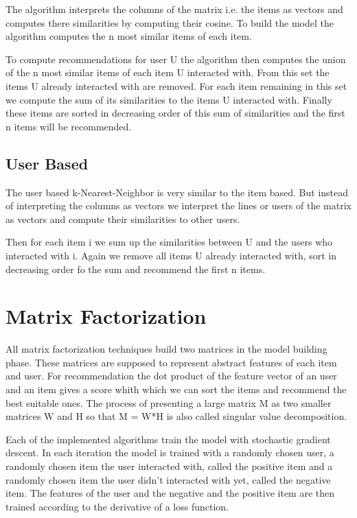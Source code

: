 The algorithm interprets the columns of the matrix i.e. the items
as vectors and computes there similarities by computing their cosine.
To build the model the algorithm computes the n most similar items
of each item. 

To compute recommendations for user U the algorithm then computes
the union of the n most similar items of each item U interacted with.
From this set the items U already interacted with are removed. For
each item remaining in this set we compute the sum of its similarities
to the items U interacted with. Finally these items are sorted in
decreasing order of this sum of similarities and the first n items
will be recommended\cite{Karypis:2001:EIT:502585.502627}.


\subsection{User Based}

The user based k-Nearest-Neighbor is very similar to the item based.
But instead of interpreting the columns as vectors we interpret the
lines or users of the matrix as vectors and compute their similarities
to other users.

Then for each item i we sum up the similarities between U and the
users who interacted with i. Again we remove all items U already interacted
with, sort in decreasing order fo the sum and recommend the first
n items.


\section{Matrix Factorization}

All matrix factorization techniques build two matrices in the model
building phase. These matrices are supposed to represent abstract
features of each item and user. For recommendation the dot product
of the feature vector of an user and an item gives a score whith which
we can sort the items and recommend the best suitable ones. The process
of presenting a large matrix M as two smaller matrices W and H so
that M = W{*}H is also called singular value decomposition.

Each of the implemented algorithms train the model with stochastic
gradient descent. In each iteration the model is trained with a randomly
chosen user, a randomly chosen item the user interacted with, called
the positive item and a randomly chosen item the user didn't interacted
with yet, called the negative item. The features of the user and the
negative and the positive item are then trained according to the derivative
of a loss function.


